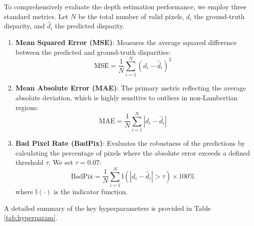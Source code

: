 \documentclass[lettersize,journal]{IEEEtran}
\begin{document}
To comprehensively evaluate the depth estimation performance, we employ three standard metrics. Let $N$ be the total number of valid pixels, $d_i$ the ground-truth disparity, and $\hat{d}_i$ the predicted disparity.
\begin{enumerate}
    \item \textbf{Mean Squared Error (MSE)}: Measures the average squared difference between the predicted and ground-truth disparities:
    $$ \text{MSE} = \frac{1}{N} \sum_{i=1}^{N} (d_i - \hat{d}_i)^2 $$
    \item \textbf{Mean Absolute Error (MAE)}: The primary metric reflecting the average absolute deviation, which is highly sensitive to outliers in non-Lambertian regions:
    $$ \text{MAE} = \frac{1}{N} \sum_{i=1}^{N} |d_i - \hat{d}_i| $$
    \item \textbf{Bad Pixel Rate (BadPix)}: Evaluates the robustness of the predictions by calculating the percentage of pixels where the absolute error exceeds a defined threshold $\tau$. We set $\tau = 0.07$:
    $$ \text{BadPix} = \frac{1}{N} \sum_{i=1}^{N} \mathbb{I}(|d_i - \hat{d}_i| > \tau) \times 100\% $$
    where $\mathbb{I}(\cdot)$ is the indicator function.
\end{enumerate}

A detailed summary of the key hyperparameters is provided in Table \ref{tab:hyperparam}.
\end{document}
